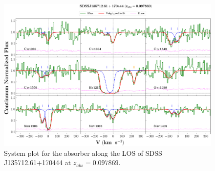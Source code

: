   \begin{landscape}
  
  \begin{figure}
      \centering
      \vspace{-20mm}
      \hspace*{-35mm}
      \includegraphics[width=1.25\linewidth]{System-Plots/SDSSJ135712.61+170444_z=0.097869_sys_plot.png}
      \caption{System plot for the absorber along the LOS of SDSS J135712.61+170444 at $z_{abs} = 0.097869$. }
  \end{figure}
  
  \end{landscape}
  
